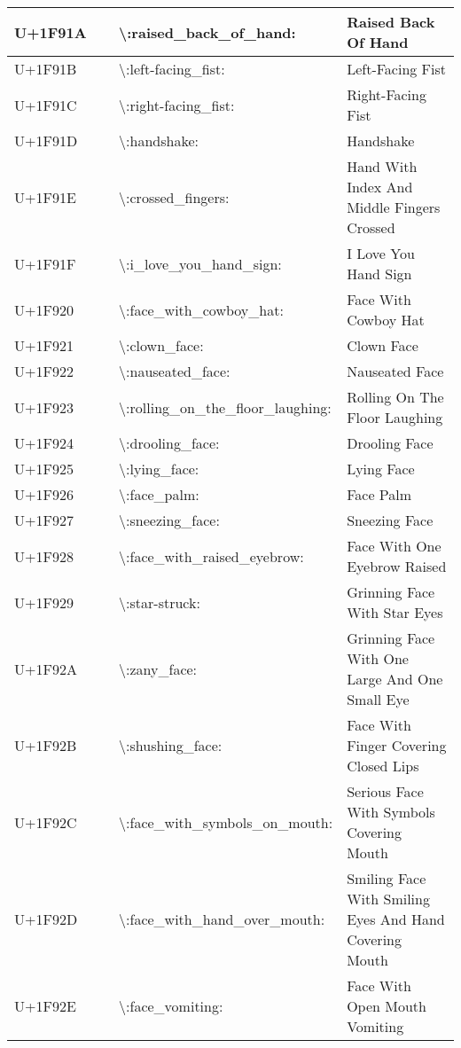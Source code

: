\begin{table}[h]
\begin{tabulary}{\linewidth}{|L|L|L|L|}
\hline
U+1F91A & 🤚 & {\textbackslash}:raised\_back\_of\_hand: & Raised Back Of Hand \\
\hline
U+1F91B & 🤛 & {\textbackslash}:left-facing\_fist: & Left-Facing Fist \\
\hline
U+1F91C & 🤜 & {\textbackslash}:right-facing\_fist: & Right-Facing Fist \\
\hline
U+1F91D & 🤝 & {\textbackslash}:handshake: & Handshake \\
\hline
U+1F91E & 🤞 & {\textbackslash}:crossed\_fingers: & Hand With Index And Middle Fingers Crossed \\
\hline
U+1F91F & 🤟 & {\textbackslash}:i\_love\_you\_hand\_sign: & I Love You Hand Sign \\
\hline
U+1F920 & 🤠 & {\textbackslash}:face\_with\_cowboy\_hat: & Face With Cowboy Hat \\
\hline
U+1F921 & 🤡 & {\textbackslash}:clown\_face: & Clown Face \\
\hline
U+1F922 & 🤢 & {\textbackslash}:nauseated\_face: & Nauseated Face \\
\hline
U+1F923 & 🤣 & {\textbackslash}:rolling\_on\_the\_floor\_laughing: & Rolling On The Floor Laughing \\
\hline
U+1F924 & 🤤 & {\textbackslash}:drooling\_face: & Drooling Face \\
\hline
U+1F925 & 🤥 & {\textbackslash}:lying\_face: & Lying Face \\
\hline
U+1F926 & 🤦 & {\textbackslash}:face\_palm: & Face Palm \\
\hline
U+1F927 & 🤧 & {\textbackslash}:sneezing\_face: & Sneezing Face \\
\hline
U+1F928 & 🤨 & {\textbackslash}:face\_with\_raised\_eyebrow: & Face With One Eyebrow Raised \\
\hline
U+1F929 & 🤩 & {\textbackslash}:star-struck: & Grinning Face With Star Eyes \\
\hline
U+1F92A & 🤪 & {\textbackslash}:zany\_face: & Grinning Face With One Large And One Small Eye \\
\hline
U+1F92B & 🤫 & {\textbackslash}:shushing\_face: & Face With Finger Covering Closed Lips \\
\hline
U+1F92C & 🤬 & {\textbackslash}:face\_with\_symbols\_on\_mouth: & Serious Face With Symbols Covering Mouth \\
\hline
U+1F92D & 🤭 & {\textbackslash}:face\_with\_hand\_over\_mouth: & Smiling Face With Smiling Eyes And Hand Covering Mouth \\
\hline
U+1F92E & 🤮 & {\textbackslash}:face\_vomiting: & Face With Open Mouth Vomiting \\

\end{tabulary}
\end{table}
